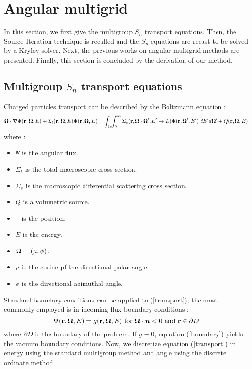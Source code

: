 \section{Angular multigrid}
In this section, we first give the multigroup $S_n$ transport equations. Then,
the Source Iteration technique is recalled and the $S_n$ equations are
recast to be solved by a Krylov solver. Next, the previous works on angular
multigrid methods are presented. Finally, this section is concluded by the derivation
of our method.  
\subsection{Multigroup $S_n$ transport equations} 
Charged particles transport can be described by the Boltzmann equation :
\begin{equation}
\boldsymbol{\Omega} \cdot \boldsymbol{\nabla} \Psi(\mathbf{r},\boldsymbol{\Omega},E) + \Sigma_t(\mathbf{r},\boldsymbol{\Omega},E) \Psi(\mathbf{r},\boldsymbol{\Omega},E) =
\int_{4\pi}\!\!\int_{0}^{\infty}\Sigma_s(\mathbf{r},\boldsymbol{\Omega}\cdot\boldsymbol{\Omega}',E'\rightarrow
E)\Psi(\mathbf{r},\boldsymbol{\Omega}',E')\ dE'd\boldsymbol{\Omega}'+Q(\mathbf{r},\boldsymbol{\Omega},E) 
\label{transport}
\end{equation}
where :
\begin{itemize}
\item $\Psi$ is the angular flux.
\item $\Sigma_t$ is the total macroscopic cross section.
\item $\Sigma_s$ is the macroscopic differential scattering cross section.
\item $Q$ is a volumetric source.
\item $\mathbf{r}$ is the position.
\item $E$ is the energy.
\item $\boldsymbol{\Omega} = (\mu,\phi)$.
\item $\mu$ is the cosine pf the directional polar angle.
\item $\phi$ is the directional azimuthal angle.
\end{itemize}
Standard boundary conditions can be applied to (\ref{transport}); the most
commonly employed is in incoming flux boundary conditions :
\begin{equation}
\Psi(\mathbf{r},\boldsymbol{\Omega},E) = g(\mathbf{r},\boldsymbol{\Omega},E)\textrm{ for }\boldsymbol{\Omega}\cdot\boldsymbol{n}<0\textrm{ and
}\mathbf{r}\in \partial D
\label{boundary}
\end{equation} 
where $\partial D$ is the boundary of the problem. If $g=0$, equation
(\ref{boundary}) yields the vacuum boundary conditions.
Now, we discretize equation (\ref{transport}) in energy using the standard multigroup
method \cite{reuss} and angle using the discrete ordinate method
